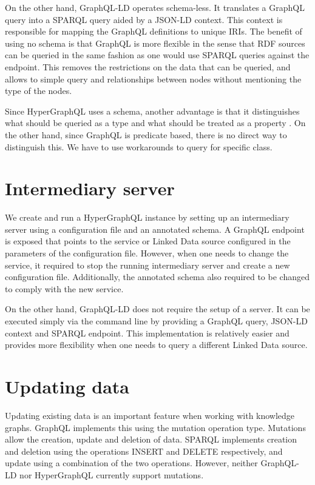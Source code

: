 On the other hand, GraphQL-LD operates schema-less. It translates a GraphQL query into a SPARQL query aided by a JSON-LD context. This context is responsible for mapping the GraphQL definitions to unique IRIs. The benefit of using no schema is that GraphQL is more flexible in the sense that RDF sources can be queried in the same fashion as one would use SPARQL queries against the endpoint. This removes the restrictions on the data that can be queried, and allows to simple query and relationships between nodes without mentioning the type of the nodes.

Since HyperGraphQL uses a schema, another advantage is that it distinguishes what should be queried as a type and what should be treated as a property \cite{Werbrouck2019a}. On the other hand, since GraphQL is predicate based, there is no direct way to distinguish this. We have to use workarounds to query for specific class.



\section{Intermediary server}
We create and run a HyperGraphQL instance by setting up an intermediary server using a configuration file and an annotated schema. A GraphQL endpoint is exposed that points to the service or Linked Data source configured in the parameters of the configuration file. However, when one needs to change the service, it required to stop the running intermediary server and create a new configuration file. Additionally, the annotated schema also required to be changed to comply with the new service. 

On the other hand, GraphQL-LD does not require the setup of a server. It can be executed simply via the command line by providing a GraphQL query, JSON-LD context and SPARQL endpoint. This implementation is relatively easier and provides more flexibility when one needs to query a different Linked Data source. 



\section{Updating data}
Updating existing data is an important feature when working with knowledge graphs. GraphQL implements this using the mutation operation type. Mutations allow the creation, update and deletion of data. SPARQL implements creation and deletion using the operations INSERT and DELETE respectively, and update using a combination of the two operations. However, neither GraphQL-LD nor HyperGraphQL currently support mutations. 


